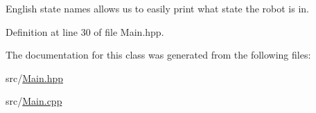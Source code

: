 English state names allows us to easily print what state the robot is in. 



Definition at line 30 of file Main.\-hpp.



The documentation for this class was generated from the following files\-:\begin{DoxyCompactItemize}
\item 
src/\hyperlink{Main_8hpp}{Main.\-hpp}\item 
src/\hyperlink{Main_8cpp}{Main.\-cpp}\end{DoxyCompactItemize}

